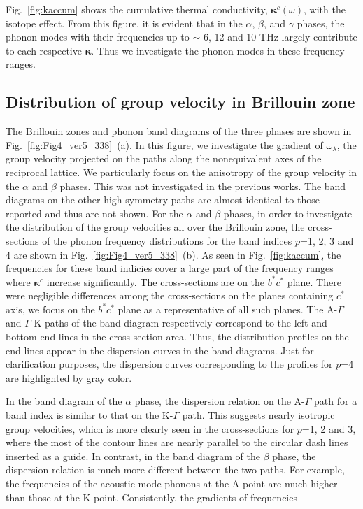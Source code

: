 \documentclass[twocolumn,amsmath,amssymb,a4paper,prb,superscriptaddress,floatfix]{revtex4-1}
\begin{document}
Fig.~\ref{fig:kaccum} shows the cumulative thermal conductivity,
$\boldsymbol{\kappa}^c(\omega)$, with the isotope effect.  From this figure, it
is evident that in the $\alpha$, $\beta$, and $\gamma$ phases, the phonon modes
with their frequencies up to $\sim$ 6, 12 and 10 THz largely contribute to each
respective $\boldsymbol{\kappa}$. Thus we investigate the phonon modes
in these frequency ranges.

\subsection{Distribution of group velocity in Brillouin zone}

The Brillouin zones and phonon band diagrams of the three phases are shown in
Fig.~\ref{fig:Fig4_ver5_338}~(a). In this figure, we investigate the
gradient of $\omega_\lambda$, the group velocity projected on the paths along the nonequivalent
axes of the reciprocal lattice. We particularly focus on the anisotropy of the
group velocity in the $\alpha$ and $\beta$ phases. This was not investigated
in the previous works\cite{kuwabara,xu}. The band diagrams on the other high-symmetry paths are
almost identical to those reported\cite{kuwabara,xu} and thus are not shown.
For the $\alpha$ and $\beta$ phases, in order to investigate the distribution of
the group velocities all over the Brillouin zone, the cross-sections of the
phonon frequency distributions for the band indices $p$=1, 2, 3 and 4 are shown in
Fig.~\ref{fig:Fig4_ver5_338}~(b). As seen in Fig.~\ref{fig:kaccum}, the
frequencies for these band indicies cover a large part of the frequency ranges
where $\boldsymbol{\kappa}^c$ increase significantly. The cross-sections are on the $b^*c^*$ plane.
There were negligible differences among the cross-sections on the planes
containing $c^*$ axis, we focus on the $b^*c^*$ plane as a representative of all
such planes.
The A-$\Gamma$ and $\Gamma$-K paths of the band diagram
respectively correspond to the left and bottom end lines in the
cross-section area.
Thus, the distribution profiles on the end lines appear in  the
dispersion curves in the band diagrams.
Just for clarification purposes, the dispersion curves
corresponding to the profiles for $p$=4 are highlighted by gray color.

In the band diagram of the $\alpha$ phase, the dispersion relation on the
A-$\Gamma$ path for a band index is similar to that on the K-$\Gamma$ path.
This suggests nearly isotropic group velocities, which is more clearly seen in
the cross-sections for $p$=1, 2 and 3, where the most of the contour lines are
nearly parallel to the circular dash lines inserted as a guide.  In contrast, in
the band diagram of the $\beta$ phase, the dispersion relation is much more
different between the two paths. For example, the frequencies of the
acoustic-mode phonons at the A point are much higher
than those at the K point.
Consistently, the gradients of frequencies
\end{document}
